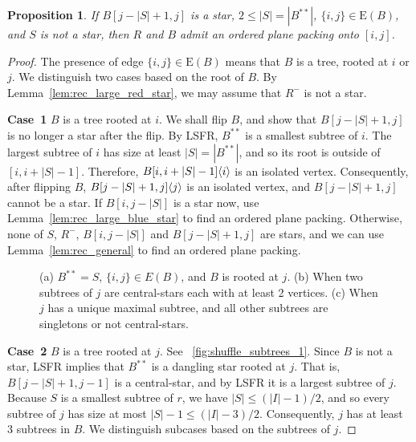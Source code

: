 \documentclass[11pt,a4paper,colorlinks=true,urlcolor=blue,citecolor=red]{article}
\theoremstyle{plain}
\newtheorem{proposition}[theorem]{Proposition}
\newcommand{\case}[1]{\par\vspace{.5\baselineskip}\noindent\textbf{\sffamily Case~#1}}
\newcommand{\EB}{\mathrm{E}(B)}
\begin{document}
\begin{proposition}\label{prop:rec_small_blue_star_equal_ij_used_no_red_star}
  If $B[j-|S|+1,j]$ is a star, $2\leq |S|=|B^{**}|$,
  $\{i,j\}\in\EB$, and $S$ is not a star, then $R$ and $B$
  admit an ordered plane packing onto $[i,j]$.
\end{proposition}
\begin{proof}
  The presence of edge $\{i,j\}\in \EB$ means that $B$ is a tree, rooted
  at $i$ or $j$. We distinguish two cases based on the root of $B$. By
  Lemma~\ref{lem:rec_large_red_star}, we may assume that $R^-$ is not a star.

  \case{1} $B$ is a tree rooted at $i$. We shall flip $B$, and show that
  $B[j-|S|+1,j]$ is no longer a star after the flip. By LSFR, $B^{**}$
  is a smallest subtree of $i$. The largest subtree of $i$ has size at
  least $|S|=|B^{**}|$, and so its root is outside of $[i,i+|S|-1]$.
  Therefore, $B{[i,i+|S|-1]}\langle{i}\rangle$ is an isolated vertex.
  Consequently, after flipping $B$, $B{[j-|S|+1,j]}\langle{j}\rangle$ is
  an isolated vertex, and $B[j-|S|+1,j]$ cannot be a star. If
  $B[i,j-|S|]$ is a star now, use Lemma~\ref{lem:rec_large_blue_star} to
  find an ordered plane packing. Otherwise, none of $S$, $R^-$,
  $B[i,j-|S|]$ and $B[j-|S|+1,j]$ are stars, and we can use
  Lemma~\ref{lem:rec_general} to find an ordered plane packing.

  \begin{figure}[htbp]
    \centering\hfil {}\hfil {}\hfil {}\hfil \caption{(a) $B^{**}=S$, $\{i,j\}\in E(B)$, and $B$ is rooted at $j$.
      (b) When two subtrees of $j$ are central-stars each with at least 2 vertices.
      (c) When $j$ has a unique maximal subtree, and all other subtrees are singletons or not central-stars.
}
    \label{fig:shuffle_subtrees}
  \end{figure}

  \case{2} $B$ is a tree rooted at $j$. See
  \figurename~\ref{fig:shuffle_subtrees_1}. Since $B$ is not a star,
  LSFR implies that $B^{**}$ is a dangling star rooted at $j$. That is,
  $B[j-|S|+1,j-1]$ is a central-star, and by LSFR it is a largest
  subtree of $j$. Because $S$ is a smallest subtree of $r$, we have
  $|S|\leq (|I|-1)/2$, and so every subtree of $j$ has size at most
  $|S|-1\leq (|I|-3)/2$. Consequently, $j$ has at least 3 subtrees in
  $B$. We distinguish subcases based on the subtrees of $j$.


\end{proof}
\end{document}

